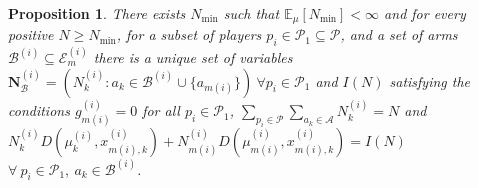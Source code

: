\documentclass{article}
\newcommand{\E}{\mathbb{E}}
\newtheorem{proposition}[theorem]{Proposition}
\begin{document}
\begin{proposition}
There exists $N_{\min}$ such that $\E_{\mu}[N_{\min}]<\infty$ and for every positive $N\geq N_{\min}$, for a subset of players $p_i\in \mathcal{P}_{1}\subseteq\mathcal{P}$, and a set of arms $\mathcal{B}^{(i)}\subseteq\mathcal{E}_{m}^{(i)}$ there is a unique set of variables $\bm{N}^{(i)}_{\mathcal{B}} = \left(N^{(i)}_k: a_k\in\mathcal{B}^{(i)}\cup\{a_{m(i)}\}\right)\ \forall p_i\in \mathcal{P}_{1}$ and $I(N)$ satisfying the conditions $g^{(i)}_{m(i)} = 0$ for all  $p_i\in\mathcal{P}_{1}$, $\sum_{p_i\in\mathcal{P}}\sum_{a_k\in\mathcal{A}}N^{(i)}_k = N$ and $N^{(i)}_{k}D\left(\mu^{(i)}_{k},x^{(i)}_{m(i),k}\right)+N^{(i)}_{m(i)}D\left(\mu^{(i)}_{m(i)},x^{(i)}_{m(i),k}\right)=I(N)$ $\forall ~ p_i\in\mathcal{P}_{1}, ~a_k\in\mathcal{B}^{(i)}$.
\end{proposition}





\end{document}
